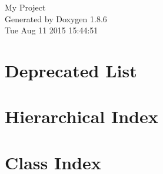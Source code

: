 \documentclass[twoside]{book}
\newcommand{\clearemptydoublepage}{%
  \newpage{\pagestyle{empty}\cleardoublepage}%
}
\begin{document}
\hypersetup{pageanchor=false}
\begin{titlepage}
\vspace*{7cm}
\begin{center}%
{\Large My Project }\\
\vspace*{1cm}
{\large Generated by Doxygen 1.8.6}\\
\vspace*{0.5cm}
{\small Tue Aug 11 2015 15:44:51}\\
\end{center}
\end{titlepage}
\clearemptydoublepage
\tableofcontents
\clearemptydoublepage
{}
\hypersetup{pageanchor=true}

\chapter{Deprecated List}
\label{deprecated}
\hypertarget{deprecated}{}

\chapter{Hierarchical Index}

\chapter{Class Index}

\end{document}
